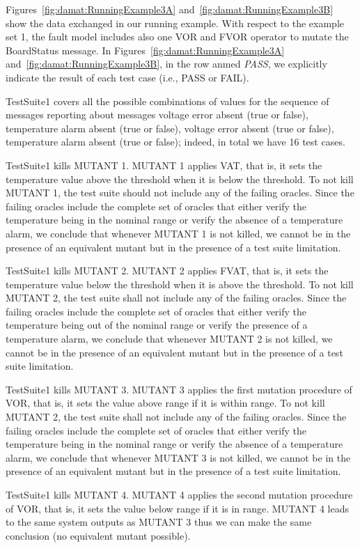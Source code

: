 Figures~\ref{fig:damat:RunningExample3A} and~\ref{fig:damat:RunningExample3B} show the data exchanged in our running example. With respect to the example set 1, the fault model includes also one VOR and FVOR operator to mutate the BoardStatus message. In Figures~\ref{fig:damat:RunningExample3A} and~\ref{fig:damat:RunningExample3B}, in the row anmed \emph{PASS}, we explicitly indicate the result of each test case (i.e., PASS or FAIL).

TestSuite1 covers all the possible combinations of values for the sequence of messages reporting about messages voltage error absent (true or false), temperature alarm absent (true or false), voltage error absent (true or false), temperature alarm absent (true or false); indeed, in total we have 16 test cases.

TestSuite1 kills MUTANT 1. MUTANT 1 applies VAT, that is, it sets the temperature value above the threshold when it is below the threshold. To not kill MUTANT 1, the test suite should not include any of the failing oracles. Since the failing oracles include the complete set of oracles that either verify the temperature being in the nominal range or verify the absence of a temperature alarm, we conclude that whenever MUTANT 1 is not killed, we cannot be in the presence of an equivalent mutant but in the presence of a test suite limitation.

TestSuite1 kills MUTANT 2. MUTANT 2 applies FVAT, that is, it sets the temperature value below the threshold when it is above the threshold. To not kill MUTANT 2, the test suite shall not include any of the failing oracles. Since the failing oracles include the complete set of oracles that either verify the temperature being out of the nominal range or verify the presence of a temperature alarm, we conclude that whenever MUTANT 2 is not killed, we cannot be in the presence of an equivalent mutant but in the presence of a test suite limitation.

TestSuite1 kills MUTANT 3. MUTANT 3 applies the first mutation procedure of VOR, that is, it sets the value above range if it is within range. To not kill MUTANT 2, the test suite shall not include any of the failing oracles. Since the failing oracles include the complete set of oracles that either verify the temperature being in the nominal range or verify the absence of a temperature alarm, we conclude that whenever MUTANT 3 is not killed, we cannot be in the presence of an equivalent mutant but in the presence of a test suite limitation.

TestSuite1 kills MUTANT 4. MUTANT 4 applies the second mutation procedure of VOR, that is, it sets the value below range if it is in range. MUTANT 4 leads to the same system outputs as MUTANT 3 thus we can make the same conclusion (no equivalent mutant possible).

